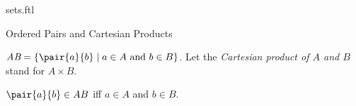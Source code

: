 \documentclass{naproche-library}
\begin{document}
\begin{smodule}[title=Classes and Sets]{sets.ftl}
\begin{sfragment}{Ordered Pairs and Cartesian Products}
  \begin{definition}[forthel,id=CartesianProductDef]
    $\emph{A\times B}=\{\pair{a}{b}\mid a\in A\text{ and }b\in B\}$.
    Let the \emph{Cartesian product of $A$ and $B$} stand for $A\times B$.
  \end{definition}

  \begin{proposition}[forthel,id=CartesianProductProp]
    $\pair{a}{b}\in A\times B$ iff $a\in A$ and $b\in B$.
  \end{proposition}
\end{sfragment}
\end{smodule}
\end{document}
